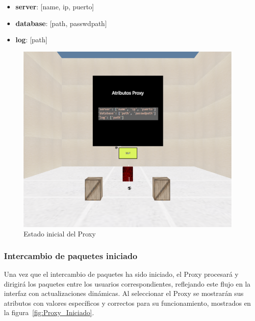 \documentclass[a4paper, 12pt]{book}
\begin{document}
\begin{itemize}
  \item \textbf{server}: [name, ip, puerto]
  \item \textbf{database}: [path, passwdpath]
  \item \textbf{log}: [path]
\end{itemize}

\begin{figure}
  \centering
  \includegraphics[width=15cm, keepaspectratio]{img/resultados/Proxy_NoIniciado.png}
  \caption{Estado inicial del Proxy}
  \label{fig:Proxy_NoIniciado}
\end{figure}

\subsubsection{Intercambio de paquetes iniciado}
\label{subsubsec:Proxy_Intercambio_Iniciado}
Una vez que el intercambio de paquetes ha sido iniciado, el Proxy procesará y dirigirá los paquetes entre los usuarios correspondientes, 
reflejando este flujo en la interfaz con actualizaciones dinámicas. Al seleccionar el Proxy se mostrarán sus atributos con valores específicos 
y correctos para su funcionamiento, mostrados en la figura~\ref{fig:Proxy_Iniciado}.
\end{document}
